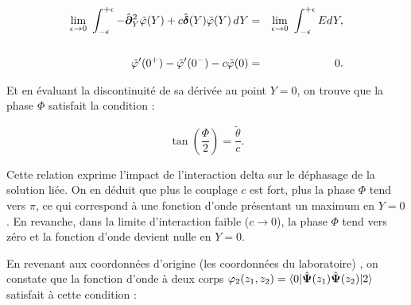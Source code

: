 \begin{eqnarray*}
	\underset{ \epsilon \to 0 }{\lim} \int_{-\epsilon}^{+\epsilon}  - 	\operator{\partial}_Y^2\tilde{\varphi}(Y) + c \operator{\delta} ( Y )\tilde{\varphi}(Y) \, dY  & = & \underset{ \epsilon \to 0 }{\lim}  \int_{-\epsilon}^{+\epsilon}  E d Y ,\\
	\\
	\tilde{\varphi}'(0^+) - \tilde{\varphi}'(0^-) - c \tilde{\varphi} (  0 ) & = & 0 .
\end{eqnarray*}



Et en évaluant la discontinuité de sa dérivée au point $Y = 0$, on trouve que la phase $\Phi$ satisfait la condition :

\begin{equation}
	\tan\left( \frac{\Phi}{2} \right) = \frac{\tilde{\theta}}{c}.
\end{equation}

Cette relation exprime l’impact de l’interaction delta sur le déphasage de la solution liée. On en déduit que plus le couplage $c$ est fort, plus la phase $\Phi$ tend vers $\pi$, ce qui correspond à une fonction d’onde présentant un maximum en $Y = 0$. En revanche, dans la limite d’interaction faible ($c \to 0$), la phase $\Phi$ tend vers zéro et la fonction d’onde devient nulle en $Y = 0$.

En revenant aux coordonnées d'origine (les coordonnées du laboratoire) , on constate que la fonction d'onde à deux corps $\varphi_2 (z_1, z_2) = \langle 0 \vert \hat{\bm{\Psi}} (z_1)\hat{\bm{\Psi}} (z_2) \vert 2 \rangle$ satisfait à cette condition :\\

